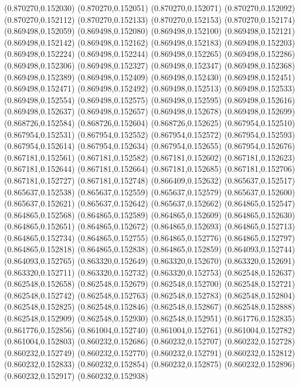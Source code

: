 (0.870270,0.152030)
(0.870270,0.152051)
(0.870270,0.152071)
(0.870270,0.152092)
(0.870270,0.152112)
(0.870270,0.152133)
(0.870270,0.152153)
(0.870270,0.152174)
(0.869498,0.152059)
(0.869498,0.152080)
(0.869498,0.152100)
(0.869498,0.152121)
(0.869498,0.152142)
(0.869498,0.152162)
(0.869498,0.152183)
(0.869498,0.152203)
(0.869498,0.152224)
(0.869498,0.152244)
(0.869498,0.152265)
(0.869498,0.152286)
(0.869498,0.152306)
(0.869498,0.152327)
(0.869498,0.152347)
(0.869498,0.152368)
(0.869498,0.152389)
(0.869498,0.152409)
(0.869498,0.152430)
(0.869498,0.152451)
(0.869498,0.152471)
(0.869498,0.152492)
(0.869498,0.152513)
(0.869498,0.152533)
(0.869498,0.152554)
(0.869498,0.152575)
(0.869498,0.152595)
(0.869498,0.152616)
(0.869498,0.152637)
(0.869498,0.152657)
(0.869498,0.152678)
(0.869498,0.152699)
(0.868726,0.152584)
(0.868726,0.152604)
(0.868726,0.152625)
(0.867954,0.152510)
(0.867954,0.152531)
(0.867954,0.152552)
(0.867954,0.152572)
(0.867954,0.152593)
(0.867954,0.152614)
(0.867954,0.152634)
(0.867954,0.152655)
(0.867954,0.152676)
(0.867181,0.152561)
(0.867181,0.152582)
(0.867181,0.152602)
(0.867181,0.152623)
(0.867181,0.152644)
(0.867181,0.152664)
(0.867181,0.152685)
(0.867181,0.152706)
(0.867181,0.152727)
(0.867181,0.152748)
(0.866409,0.152632)
(0.865637,0.152517)
(0.865637,0.152538)
(0.865637,0.152559)
(0.865637,0.152579)
(0.865637,0.152600)
(0.865637,0.152621)
(0.865637,0.152642)
(0.865637,0.152662)
(0.864865,0.152547)
(0.864865,0.152568)
(0.864865,0.152589)
(0.864865,0.152609)
(0.864865,0.152630)
(0.864865,0.152651)
(0.864865,0.152672)
(0.864865,0.152693)
(0.864865,0.152713)
(0.864865,0.152734)
(0.864865,0.152755)
(0.864865,0.152776)
(0.864865,0.152797)
(0.864865,0.152818)
(0.864865,0.152838)
(0.864865,0.152859)
(0.864093,0.152744)
(0.864093,0.152765)
(0.863320,0.152649)
(0.863320,0.152670)
(0.863320,0.152691)
(0.863320,0.152711)
(0.863320,0.152732)
(0.863320,0.152753)
(0.862548,0.152637)
(0.862548,0.152658)
(0.862548,0.152679)
(0.862548,0.152700)
(0.862548,0.152721)
(0.862548,0.152742)
(0.862548,0.152763)
(0.862548,0.152783)
(0.862548,0.152804)
(0.862548,0.152825)
(0.862548,0.152846)
(0.862548,0.152867)
(0.862548,0.152888)
(0.862548,0.152909)
(0.862548,0.152930)
(0.862548,0.152951)
(0.861776,0.152835)
(0.861776,0.152856)
(0.861004,0.152740)
(0.861004,0.152761)
(0.861004,0.152782)
(0.861004,0.152803)
(0.860232,0.152686)
(0.860232,0.152707)
(0.860232,0.152728)
(0.860232,0.152749)
(0.860232,0.152770)
(0.860232,0.152791)
(0.860232,0.152812)
(0.860232,0.152833)
(0.860232,0.152854)
(0.860232,0.152875)
(0.860232,0.152896)
(0.860232,0.152917)
(0.860232,0.152938)
